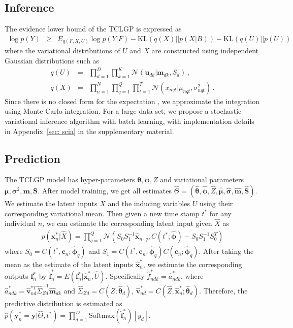 \documentclass{article}
\begin{document}
\subsection{Inference}
The evidence lower bound of the TCLGP is expressed as
\begin{eqnarray}
\log p(Y) & \geq & E_{q(F,X,U)}\log p(Y|F) - \mathrm{KL}(q(X)||p(X|B)) - \mathrm{KL}(q(U)||p(U)) \nonumber 
\end{eqnarray}
where the variational distributions of $U$ and $X$ are constructed using independent Gaussian distributions such as 
\begin{eqnarray}
q(U) & = & \prod_{d = 1}^{D}\prod_{k = 1}^{K}\mathcal{N}(\bm u_{dk}| \bm m_{dk}, S_d)\,, \nonumber \\
q(X) & = & \prod_{n = 1}^{N}\prod_{q = 1}^{Q}\prod_{t = 1}^{T} \mathcal{N}(x_{nqt}| \mu_{nqt}, \sigma_{nqt}^2)\,. \nonumber
\end{eqnarray}
Since there is no closed form for the expectation \citep{Gal_2015}, we approximate the integration using Monte Carlo integration. For a large data set, we propose a stochastic variational inference algorithm with batch learning, with implementation details in Appendix~\ref{sec: scia} in the supplementary material.

\subsection{Prediction}
The TCLGP model has hyper-parameters $\bm\theta, \bm\phi, Z$ and variational parameters $\bm \mu, \bm \sigma^2, \bm m, \bm S$. After model training, we get all estimates $\hat{\varTheta} = (\hat{\bm \theta}, \hat{\bm \phi}, \hat{Z}, \hat{\bm \mu}, \hat{\bm \sigma}, \hat{\bm m}, \hat{\bm S})$. We estimate the latent inputs $X$ and the inducing variables $U$ using their corresponding variational mean. Then given a new time stamp $t^*$ for any individual $n$, we can estimate the corresponding latent input given $\hat{X}$ as 
\begin{eqnarray}
p(\bm x_n^*|\hat{X}) = \prod_{q = 1}^{Q}\mathcal{N}(S_0 S_1^{-1}\hat{\bm x}_{n\cdot q}, C(t^*; \hat{\bm \phi}) - S_0 S_1^{-1}S_0^T)
\end{eqnarray}
where $S_0 = C(t^*, \bm c_n; \hat{\bm \phi}_q)$ and $S_1 = C(t^*, \bm c_n; \hat{\bm \phi}_q)C(\bm c_n; \hat{\bm \phi}_q)$. After taking the mean as the estimate of the latent inputs $\hat{\bm x}_n^*$, we estimate the corresponding outputs $\bm f_n^*$ by $\hat{\bm f}_n^* = E(\bm f_n^*|\hat{\bm x}_n^*, \hat{U})$. Specifically $\hat{f}^*_{ndk} = \hat{a}_{ndk}^*$, where  $\hat{a}_{ndk}^* = \hat{\bm v}^{*T}_{nd}\hat{\Sigma}_{Zd}^{-1}\hat{\bm m}_{dk}$ and $\hat{\Sigma}_{Zd} = C(\hat{Z}; \hat{\bm \theta}_d)$, $\hat{\bm v}_{nd}^* = C(\hat{Z}, \hat{\bm x}_n^*; \hat{\bm \theta}_d)$. Therefore, the predictive distribution is estimated as $\hat{p}(\bm y_n^* = \bm y|\hat{\varTheta}, t^*) = \prod_{d = 1}^D \mathrm{Softmax}(\hat{\bm f}_n^*)[y_d]$.
\end{document}
